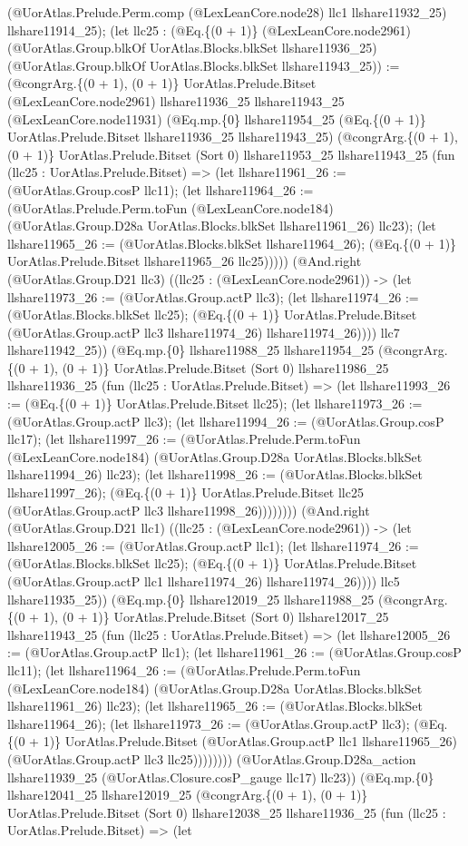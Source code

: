 \documentclass[11pt]{article}
\begin{document}
(@UorAtlas.Prelude.Perm.comp (@LexLeanCore.node28) llc1 llshare11932\_25) llshare11914\_25); (let llc25 : (@Eq.\{(0 + 1)\} (@LexLeanCore.node2961) (@UorAtlas.Group.blkOf UorAtlas.Blocks.blkSet llshare11936\_25) (@UorAtlas.Group.blkOf UorAtlas.Blocks.blkSet llshare11943\_25)) := (@congrArg.\{(0 + 1), (0 + 1)\} UorAtlas.Prelude.Bitset (@LexLeanCore.node2961) llshare11936\_25 llshare11943\_25 (@LexLeanCore.node11931) (@Eq.mp.\{0\} llshare11954\_25 (@Eq.\{(0 + 1)\} UorAtlas.Prelude.Bitset llshare11936\_25 llshare11943\_25) (@congrArg.\{(0 + 1), (0 + 1)\} UorAtlas.Prelude.Bitset (Sort 0) llshare11953\_25 llshare11943\_25 (fun (llc25 : UorAtlas.Prelude.Bitset) => (let llshare11961\_26 := (@UorAtlas.Group.cosP llc11); (let llshare11964\_26 := (@UorAtlas.Prelude.Perm.toFun (@LexLeanCore.node184) (@UorAtlas.Group.D28a UorAtlas.Blocks.blkSet llshare11961\_26) llc23); (let llshare11965\_26 := (@UorAtlas.Blocks.blkSet llshare11964\_26); (@Eq.\{(0 + 1)\} UorAtlas.Prelude.Bitset llshare11965\_26 llc25))))) (@And.right (@UorAtlas.Group.D21 llc3) ((llc25 : (@LexLeanCore.node2961)) -> (let llshare11973\_26 := (@UorAtlas.Group.actP llc3); (let llshare11974\_26 := (@UorAtlas.Blocks.blkSet llc25); (@Eq.\{(0 + 1)\} UorAtlas.Prelude.Bitset (@UorAtlas.Group.actP llc3 llshare11974\_26) llshare11974\_26)))) llc7 llshare11942\_25)) (@Eq.mp.\{0\} llshare11988\_25 llshare11954\_25 (@congrArg.\{(0 + 1), (0 + 1)\} UorAtlas.Prelude.Bitset (Sort 0) llshare11986\_25 llshare11936\_25 (fun (llc25 : UorAtlas.Prelude.Bitset) => (let llshare11993\_26 := (@Eq.\{(0 + 1)\} UorAtlas.Prelude.Bitset llc25); (let llshare11973\_26 := (@UorAtlas.Group.actP llc3); (let llshare11994\_26 := (@UorAtlas.Group.cosP llc17); (let llshare11997\_26 := (@UorAtlas.Prelude.Perm.toFun (@LexLeanCore.node184) (@UorAtlas.Group.D28a UorAtlas.Blocks.blkSet llshare11994\_26) llc23); (let llshare11998\_26 := (@UorAtlas.Blocks.blkSet llshare11997\_26); (@Eq.\{(0 + 1)\} UorAtlas.Prelude.Bitset llc25 (@UorAtlas.Group.actP llc3 llshare11998\_26)))))))) (@And.right (@UorAtlas.Group.D21 llc1) ((llc25 : (@LexLeanCore.node2961)) -> (let llshare12005\_26 := (@UorAtlas.Group.actP llc1); (let llshare11974\_26 := (@UorAtlas.Blocks.blkSet llc25); (@Eq.\{(0 + 1)\} UorAtlas.Prelude.Bitset (@UorAtlas.Group.actP llc1 llshare11974\_26) llshare11974\_26)))) llc5 llshare11935\_25)) (@Eq.mp.\{0\} llshare12019\_25 llshare11988\_25 (@congrArg.\{(0 + 1), (0 + 1)\} UorAtlas.Prelude.Bitset (Sort 0) llshare12017\_25 llshare11943\_25 (fun (llc25 : UorAtlas.Prelude.Bitset) => (let llshare12005\_26 := (@UorAtlas.Group.actP llc1); (let llshare11961\_26 := (@UorAtlas.Group.cosP llc11); (let llshare11964\_26 := (@UorAtlas.Prelude.Perm.toFun (@LexLeanCore.node184) (@UorAtlas.Group.D28a UorAtlas.Blocks.blkSet llshare11961\_26) llc23); (let llshare11965\_26 := (@UorAtlas.Blocks.blkSet llshare11964\_26); (let llshare11973\_26 := (@UorAtlas.Group.actP llc3); (@Eq.\{(0 + 1)\} UorAtlas.Prelude.Bitset (@UorAtlas.Group.actP llc1 llshare11965\_26) (@UorAtlas.Group.actP llc3 llc25)))))))) (@UorAtlas.Group.D28a\_action llshare11939\_25 (@UorAtlas.Closure.cosP\_gauge llc17) llc23)) (@Eq.mp.\{0\} llshare12041\_25 llshare12019\_25 (@congrArg.\{(0 + 1), (0 + 1)\} UorAtlas.Prelude.Bitset (Sort 0) llshare12038\_25 llshare11936\_25 (fun (llc25 : UorAtlas.Prelude.Bitset) => (let 
\end{document}
